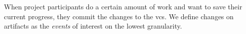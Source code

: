 
%






When project participants do a certain amount of work and want to save their current progress, they commit the changes to the \gls{vcs}. We define changes on artifacts as the \emph{events} of interest on the lowest granularity.

